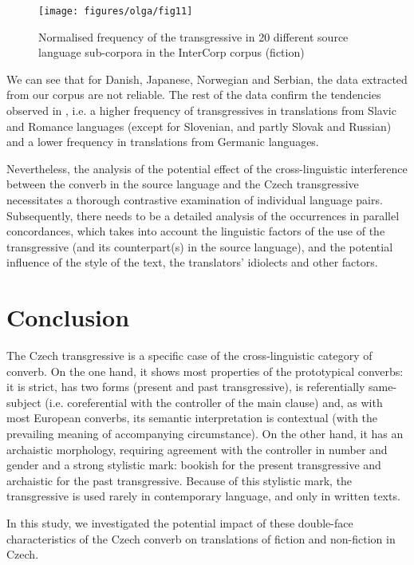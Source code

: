\documentclass[output=paper,russian]{langsci/langscibook}
\begin{document}
\begin{figure}[t]
  \texttt{[image: figures/olga/fig11]}
  \caption{Normalised frequency of the transgressive in 20 different source language sub-corpora in the InterCorp corpus (fiction)}\label{olga:f11}
\end{figure}

We can see that for Danish, Japanese, Norwegian and Serbian, the data extracted from our corpus are not reliable. The rest of the data confirm the tendencies observed in , i.e. a higher frequency of transgressives in translations from Slavic and Romance languages (except for Slovenian, and partly Slovak and Russian) and a lower frequency in translations from Germanic languages.

Nevertheless, the analysis of the potential effect of the cross-linguistic interference between the converb in the source language and the Czech transgressive necessitates a thorough contrastive examination of individual language pairs. Subsequently, there needs to be a detailed analysis of the occurrences in parallel concordances, which takes into account the linguistic factors of the use of the transgressive (and its counterpart(s) in the source language), and the potential influence of the style of the text, the translators’ idiolects and other factors. 

\section{Conclusion}

The Czech transgressive is a specific case of the cross-linguistic category of converb. On the one hand, it shows most properties of the prototypical converbs: it is strict, has two forms (present and past transgressive), is referentially same-subject (i.e. coreferential with the controller of the main clause) and, as with most European converbs, its semantic interpretation is contextual (with the prevailing meaning of accompanying circumstance). On the other hand, it has an archaistic morphology, requiring agreement with the controller in number and gender and a strong stylistic mark: bookish for the present transgressive and archaistic for the past transgressive. Because of this stylistic mark, the transgressive is used rarely in contemporary language, and only in written texts.

In this study, we investigated the potential impact of these double-face characteristics of the Czech converb on translations of fiction and non-fiction in Czech. 
\end{document}
